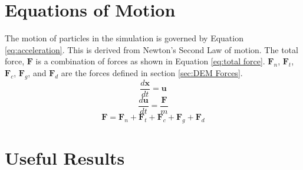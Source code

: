 \documentclass[a4paper,11pt,titlepage]{report}
\begin{document}
\section{Equations of Motion}
The motion of particles in the simulation is governed by Equation \ref{eq:acceleration}. This is derived from Newton's Second Law of motion. The total force, $\mathbf{F}$ is a combination of forces as shown in Equation \ref{eq:total force}. $\mathbf{F}_{n}$, $\mathbf{F}_{t}$, $\mathbf{F}_{c}$, $\mathbf{F}_{g}$, and $\mathbf{F}_{d}$ are the forces defined in section \ref{sec:DEM Forces}.
\begin{equation}
\dfrac{d\mathbf{x}}{dt} = \mathbf{u}
\label{eq:position}
\end{equation}
\begin{equation}
\dfrac{d\mathbf{u}}{dt} = \dfrac{\mathbf{F}}{m}
\label{eq:acceleration}
\end{equation}
\begin{equation}
\mathbf{F} = \mathbf{F}_{n} + \mathbf{F}_{t} + \mathbf{F}_{c} + \mathbf{F}_{g} + \mathbf{F}_{d}
\label{eq:total force}
\end{equation}
\section{Useful Results}
\end{document}
